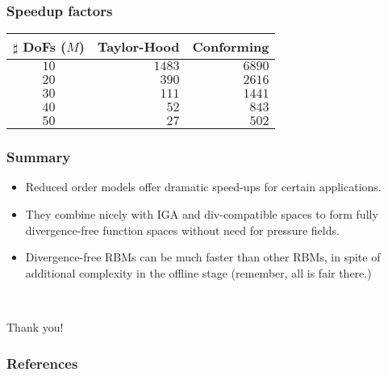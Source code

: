 \documentclass{beamer}
\begin{document}
\begin{frame}
  \frametitle{Speedup factors}

  \begin{center}
    \bgroup{}
    \begin{tabular}{crr}
      $\sharp$ DoFs ($M$) & {\bf Taylor-Hood} & {\bf Conforming} \\
      \hline $10$ & $1483$ & $6890$ \\
      $20$ & $390$ & $2616$ \\
      $30$ & $111$ & $1441$ \\
      $40$ & $52$ & $843$ \\
      $50$ & $27$ & $502$ \\
      \hline
    \end{tabular}
    \egroup
  \end{center}

\end{frame}

\begin{frame}
  \frametitle{Summary}
  \begin{itemize}
  \item Reduced order models offer dramatic speed-ups for certain applications.
  \item They combine nicely with IGA and div-compatible spaces to form fully
    divergence-free function spaces without need for pressure fields.
  \item Divergence-free RBMs can be much faster than other RBMs, in spite of additional complexity
    in the offline stage (remember, all is fair there.)
  \end{itemize}
  ~\\ \begin{center} Thank you! \end{center}
\end{frame}

\begin{frame}
  \frametitle{References}

  \printbibliography
\end{frame}
\end{document}

